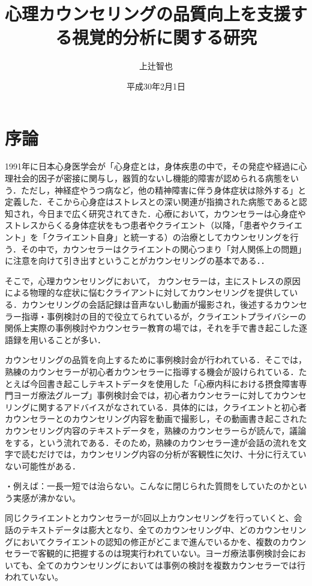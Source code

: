 \documentclass[shuuron]{kuee}
\title{心理カウンセリングの品質向上を支援する視覚的分析に関する研究}
\author{上辻智也}
\date{平成30年2月1日}
\begin{document}
\maketitle
\tableofcontents


\chapter{序論}



1991年に日本心身医学会が「心身症とは，身体疾患の中で，その発症や経過に心理社会的因子が密接に関与し，器質的ないし機能的障害が認められる病態をいう．ただし，神経症やうつ病など，他の精神障害に伴う身体症状は除外する」と定義した\cite{shinshinigaku}．そこから心身症はストレスとの深い関連が指摘された病態であると認知され，今日まで広く研究されてきた．心療において，カウンセラーは心身症やストレスからくる身体症状をもつ患者やクライエント（以降，「患者やクライエント」を「クライエント自身」と統一する）の治療としてカウンセリングを行う．その中で，カウンセラーはクライエントの関心つまり「対人関係上の問題」に注意を向けて引き出すということがカウンセリングの基本である\cite{zokad}．．

  そこで，心理カウンセリングにおいて， カウンセラーは，主にストレスの原因による物理的な症状に悩むクライアントに対してカウンセリングを提供している．カウンセリングの会話記録は音声ないし動画が撮影され，後述するカウンセラー指導・事例検討の目的で役立てられているが，クライエントプライバシーの関係上実際の事例検討やカウンセラー教育の場では，それを手で書き起こした逐語録を用いることが多い．






カウンセリングの品質を向上するために事例検討会が行われている．そこでは，熟練のカウンセラーが初心者カウンセラーに指導する機会が設けられている．たとえば今回書き起こしテキストデータを使用した「心療内科における摂食障害専門ヨーガ療法グループ」事例検討会では，初心者カウンセラーに対してカウンセリングに関するアドバイスがなされている．具体的には，クライエントと初心者カウンセラーとのカウンセリング内容を動画で撮影し，その動画書き起こされたカウンセリング内容のテキストデータを，熟練のカウンセラーらが読んで，議論をする，という流れである．そのため，熟練のカウンセラー達が会話の流れを文字で読むだけでは，カウンセリング内容の分析が客観性に欠け、十分に行えていない可能性がある．

・例えば：一長一短では治らない。こんなに閉じられた質問をしていたのかという実感が沸かない。

同じクライエントとカウンセラーが5回以上カウンセリングを行っていくと、会話のテキストデータは膨大となり、全てのカウンセリング中、どのカウンセリングにおいてクライエントの認知の修正がどこまで進んでいるかを、複数のカウンセラーで客観的に把握するのは現実行われていない。ヨーガ療法事例検討会においても、全てのカウンセリングにおいては事例の検討を複数カウンセラーでは行われていない。
\end{document}
